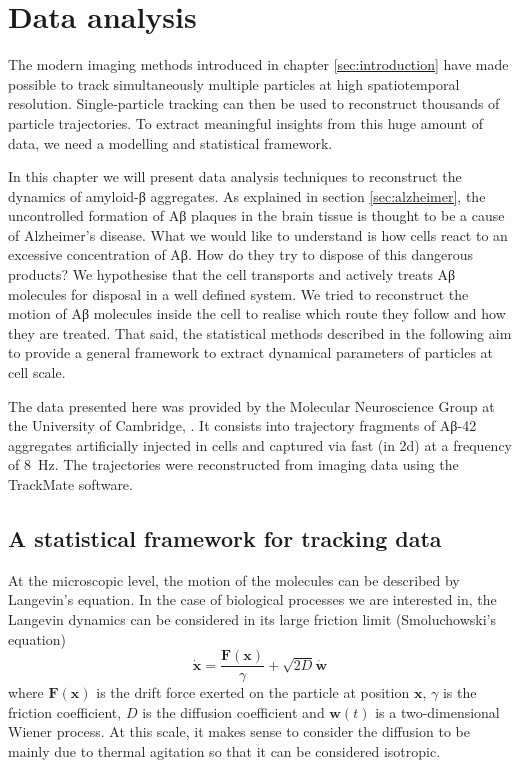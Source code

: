
\chapter{Data analysis}\label{sec:data_analysis}


The modern imaging methods introduced in chapter \ref{sec:introduction} have made possible to track simultaneously multiple particles at high spatiotemporal resolution. Single-particle tracking can then be used to reconstruct thousands of particle trajectories. To extract meaningful insights from this huge amount of data, we need a modelling and statistical framework.

In this chapter we will present data analysis techniques to reconstruct the dynamics of amyloid-β aggregates. As explained in section \ref{sec:alzheimer}, the uncontrolled formation of Aβ plaques in the brain tissue is thought to be a cause of Alzheimer's disease. What we would like to understand is how cells react to an excessive concentration of Aβ. How do they try to dispose of this dangerous products? We hypothesise that the cell transports and actively treats Aβ molecules for disposal in a well defined system. We tried to reconstruct the motion of Aβ molecules inside the cell to realise which route they follow and how they are treated. That said, the statistical methods described in the following aim to provide a general framework to extract dynamical parameters of particles at cell scale.

The data presented here was provided by the Molecular Neuroscience Group at the University of Cambridge, . It consists into trajectory fragments of Aβ-42 aggregates artificially injected in  cells and captured via fast  (in 2d) at a frequency of \SI{8}{\hertz}. The trajectories were reconstructed from imaging data using the TrackMate software.

\section{A statistical framework for tracking data}

At the microscopic level, the motion of the molecules can be described by Langevin's equation. In the case of biological processes we are interested in, the Langevin dynamics can be considered in its large friction limit (Smoluchowski's equation)
\begin{equation} \label{eq:smoluchowski}
 \dot{\bm{x}} = \frac{\bm{F}(\bm{x})}{\gamma} + \sqrt{2D} \dot{\bm{w}}
\end{equation}
where $\bm{F}(\bm{x})$ is the drift force exerted on the particle at position $\bm{x}$, $\gamma$ is the friction coefficient, $D$ is the diffusion coefficient and $\bm{w}(t)$ is a two-dimensional Wiener process. At this scale, it makes sense to consider the diffusion to be mainly due to thermal agitation so that it can be considered isotropic.

